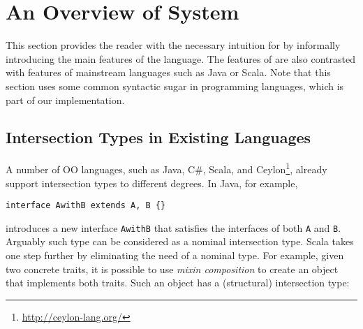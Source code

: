 \section{An Overview of System \name}



This section provides the reader with the necessary intuition for
\name by informally introducing the main features of the language.
The features of \name are also contrasted with features of mainstream
languages such as Java or Scala. Note that this section uses some
common syntactic sugar in programming languages, which is
part of our implementation.


\subsection{Intersection Types in Existing Languages}\label{subsec:interScala}

A number of OO languages, such as Java, C\#, Scala, and
Ceylon\footnote{\url{http://ceylon-lang.org/}}, already support intersection
types to different degrees. In Java, for example,

\begin{lstlisting}
interface AwithB extends A, B {}
\end{lstlisting}

\noindent introduces a new interface \lstinline{AwithB} that satisfies the interfaces of
both \lstinline{A} and \lstinline{B}. Arguably such type can be considered as a nominal
intersection type. Scala takes one step further by eliminating the
need of a nominal type. For example, given two concrete traits, it is possible to
use \emph{mixin composition} to create an object that implements both
traits. Such an object has a (structural) intersection type:

